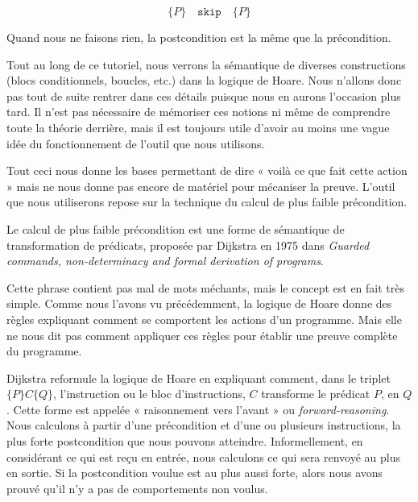 $$\{P\} \quad \texttt{skip} \quad \{P\}$$



Quand nous ne faisons rien, la postcondition est la même que la précondition.



Tout au long de ce tutoriel, nous verrons la sémantique de diverses
constructions (blocs conditionnels, boucles, etc.) dans la logique de Hoare.
Nous n'allons donc pas tout de suite rentrer dans ces détails puisque nous en
aurons l'occasion plus tard. Il n'est pas nécessaire de mémoriser ces notions
ni même de comprendre toute la théorie derrière, mais il est toujours utile
d'avoir au moins une vague idée du fonctionnement de l'outil que nous
utilisons.



Tout ceci nous donne les bases permettant de dire « voilà ce que fait cette
action » mais ne nous donne pas encore de matériel pour mécaniser la preuve.
L'outil que nous utiliserons repose sur la technique du calcul de plus
faible précondition.





Le calcul de plus faible précondition est une forme de sémantique de
transformation de prédicats, proposée par Dijkstra en 1975 dans \textit{Guarded
commands, non-determinacy and formal derivation of programs}.



Cette phrase contient pas mal de mots méchants, mais le concept est en fait très
simple. Comme nous l'avons vu précédemment, la logique de Hoare donne des
règles expliquant comment se comportent les actions d'un programme. Mais
elle ne nous dit pas comment appliquer ces règles pour établir une preuve
complète du programme.



Dijkstra reformule la logique de Hoare en expliquant comment, dans le triplet
$\{P\}C\{Q\}$, l'instruction ou le bloc d'instructions, $C$ transforme le
prédicat $P$, en $Q$. Cette forme est appelée « raisonnement vers l'avant » ou
\textit{forward-reasoning}. Nous calculons à partir d'une précondition et d'une ou
plusieurs instructions, la plus forte postcondition que nous pouvons
atteindre. Informellement, en considérant ce qui est reçu en entrée, nous
calculons ce qui sera renvoyé au plus en sortie. Si la postcondition voulue
est au plus aussi forte, alors nous avons prouvé qu'il n'y a pas de
comportements non voulus.



